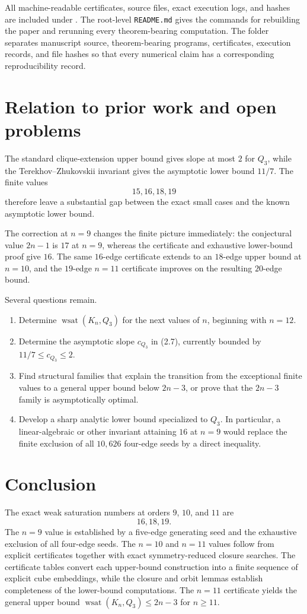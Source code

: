 \documentclass[11pt]{article}
\numberwithin{equation}{section}
\newcommand{\wsat}{\operatorname{wsat}}
\begin{document}
All machine-readable certificates, source files, exact execution logs, and hashes are included under . The root-level \texttt{README.md} gives the commands for rebuilding the paper and rerunning every theorem-bearing computation. The folder separates manuscript source, theorem-bearing programs, certificates, execution records, and file hashes so that every numerical claim has a corresponding reproducibility record.

\section{Relation to prior work and open problems}\label{sec:open}
The standard clique-extension upper bound gives slope at most $2$ for $Q_3$, while the Terekhov--Zhukovskii invariant gives the asymptotic lower bound $11/7$. The finite values
\[
15,16,18,19
\]
therefore leave a substantial gap between the exact small cases and the known asymptotic lower bound.

The correction at $n=9$ changes the finite picture immediately: the conjectural value $2n-1$ is $17$ at $n=9$, whereas the certificate and exhaustive lower-bound proof give $16$. The same $16$-edge certificate extends to an $18$-edge upper bound at $n=10$, and the $19$-edge $n=11$ certificate improves on the resulting $20$-edge bound.

Several questions remain.

\begin{enumerate}[leftmargin=2em]
\item Determine $\wsat(K_n,Q_3)$ for the next values of $n$, beginning with $n=12$.
\item Determine the asymptotic slope $c_{Q_3}$ in (2.7), currently bounded by $11/7\le c_{Q_3}\le2$.
\item Find structural families that explain the transition from the exceptional finite values to a general upper bound below $2n-3$, or prove that the $2n-3$ family is asymptotically optimal.
\item Develop a sharp analytic lower bound specialized to $Q_3$. In particular, a linear-algebraic or other invariant attaining $16$ at $n=9$ would replace the finite exclusion of all $10,626$ four-edge seeds by a direct inequality.
\end{enumerate}

\section{Conclusion}
The exact weak saturation numbers at orders $9$, $10$, and $11$ are
\[
\boxed{16,18,19}.
\]
The $n=9$ value is established by a five-edge generating seed and the exhaustive exclusion of all four-edge seeds. The $n=10$ and $n=11$ values follow from explicit certificates together with exact symmetry-reduced closure searches. The certificate tables convert each upper-bound construction into a finite sequence of explicit cube embeddings, while the closure and orbit lemmas establish completeness of the lower-bound computations. The $n=11$ certificate yields the general upper bound $\wsat(K_n,Q_3)\le2n-3$ for $n\ge11$.
\end{document}
